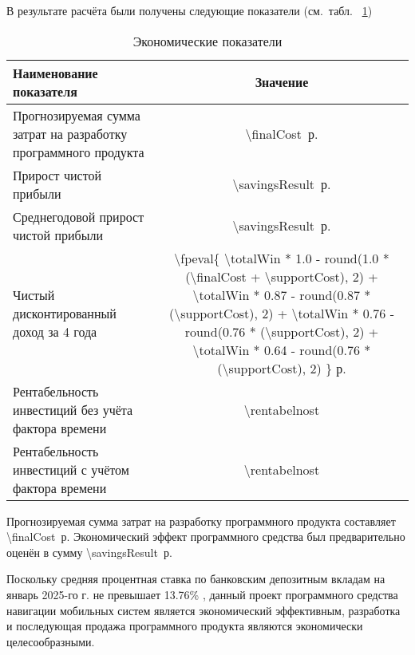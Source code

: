 В результате расчёта были получены следующие показатели (см.~табл.~
\ref{table:hehelastone})

\begin{table}
\caption{Экономические показатели}
\label{table:hehelastone}
	\begin{tabular}{|p{10cm}|c|}
		\hline
		Наименование показателя
		& Значение
		\\ \hline

		Прогнозируемая сумма затрат на разработку программного продукта
		& \num{\finalCost}~р.
		\\ \hline

		Прирост чистой прибыли
		& \num{\savingsResult}~р.
		\\ \hline

		Среднегодовой  прирост чистой прибыли
		& \num{\savingsResult}~р.
		\\ \hline

		Чистый дисконтированный доход за 4 года
		& \num{\fpeval{
			\totalWin * 1.0  -  round(1.0 * (\finalCost + \supportCost), 2) +
			\totalWin * 0.87 -  round(0.87 * (\supportCost), 2) +
			\totalWin * 0.76 -  round(0.76 * (\supportCost), 2) +
			\totalWin * 0.64 -  round(0.76 * (\supportCost), 2) 
		}} р.
		\\ \hline

		Рентабельность инвестиций без учёта фактора времени
		& \num{\rentabelnost}
		\\ \hline

		Рентабельность инвестиций с учётом фактора времени
		& \num{\rentabelnost}
		\\ \hline

	\end{tabular}
\end{table}
Прогнозируемая сумма затрат на разработку программного продукта
составляет \num{\finalCost}~р. Экономический эффект программного
средства был предварительно оценён в сумму \num{\savingsResult}~р.

Поскольку средняя процентная ставка по банковским депозитным вкладам на
январь 2025-го г. не превышает \num{13.76}\% \cite{nbrb2025}, данный проект
программного средства навигации мобильных систем является экономический
эффективным, разработка и последующая продажа программного продукта являются
экономически целесообразными.


\renewcommand{\bibsection}{\sectioncentered*{Список использованной литературы}}



